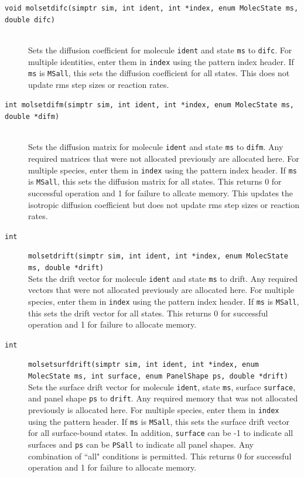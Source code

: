 \documentclass {scrbook}
\newcommand {\ttt} {\texttt}
\begin{document}
\begin{description}
\item[\ttt{void molsetdifc(simptr sim, int ident, int *index, enum MolecState ms, double difc)}]
\hfill \\
Sets the diffusion coefficient for molecule \ttt{ident} and state \ttt{ms} to \ttt{difc}. For multiple identities, enter them in \ttt{index} using the pattern index header. If \ttt{ms} is \ttt{MSall}, this sets the diffusion coefficient for all states. This does not update rms step sizes or reaction rates.

\item[\ttt{int molsetdifm(simptr sim, int ident, int *index, enum MolecState ms, double *difm)}]
\hfill \\
Sets the diffusion matrix for molecule \ttt{ident} and state \ttt{ms} to \ttt{difm}. Any required matrices that were not allocated previously are allocated here. For multiple species, enter them in \ttt{index} using the pattern index header. If \ttt{ms} is \ttt{MSall}, this sets the diffusion matrix for all states. This returns 0 for successful operation and 1 for failure to allcate memory. This updates the isotropic diffusion coefficient but does not update rms step sizes or reaction rates.

\item[\ttt{int}]
\ttt{molsetdrift(simptr sim, int ident, int *index, enum MolecState ms, double *drift)}
\hfill \\
Sets the drift vector for molecule \ttt{ident} and state \ttt{ms} to drift. Any required vectors that were not allocated previously are allocated here. For multiple species, enter them in \ttt{index} using the pattern index header. If \ttt{ms} is \ttt{MSall}, this sets the drift vector for all states. This returns 0 for successful operation and 1 for failure to allocate memory.

\item[\ttt{int}]
\ttt{molsetsurfdrift(simptr sim, int ident, int *index, enum MolecState ms, int surface, enum PanelShape ps, double *drift)}
\hfill \\
Sets the surface drift vector for molecule \ttt{ident}, state \ttt{ms}, surface \ttt{surface}, and panel shape \ttt{ps} to \ttt{drift}. Any required memory that was not allocated previously is allocated here. For multiple species, enter them in \ttt{index} using the pattern header. If \ttt{ms} is \ttt{MSall}, this sets the surface drift vector for all surface-bound states. In addition, \ttt{surface} can be -1 to indicate all surfaces and \ttt{ps} can be \ttt{PSall} to indicate all panel shapes. Any combination of ``all" conditions is permitted. This returns 0 for successful operation and 1 for failure to allocate memory.


\end{description}
\end{document}

